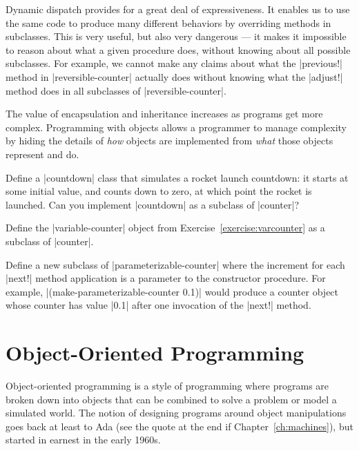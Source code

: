 \begin{schemeregion}
Dynamic dispatch provides for a great deal of expressiveness.  It enables us to use the same code to produce many different behaviors by overriding methods in subclasses.  This is very useful, but also very dangerous --- it makes it impossible to reason about what a given procedure does, without knowing about all possible subclasses.  For example, we cannot make any claims about what the \scheme|previous!| method in \scheme|reversible-counter| actually does without knowing what the \scheme|adjust!| method does in all subclasses of \scheme|reversible-counter|.  

The value of encapsulation and inheritance increases as programs get more complex.  Programming with objects allows a programmer to manage complexity by hiding the details of \emph{how} objects are implemented from \emph{what} those objects represent and do.

\beforeex
\begin{exercise}
Define a \scheme|countdown| class that simulates a rocket launch countdown: it starts at some initial value, and counts down to zero, at which point the rocket is launched.  Can you implement \scheme|countdown| as a subclass of \scheme|counter|?
\solution{\LATER{}}
\end{exercise}
\afterex

\beforeex
\begin{exercise}
Define the \scheme|variable-counter| object from Exercise~\ref{exercise:varcounter} as a subclass of \scheme|counter|.
\solution{\LATER{}}
\end{exercise}
\afterex

\beforeex
\begin{exercise}
Define a new subclass of \scheme|parameterizable-counter| where the increment for each \scheme|next!| method application is a parameter to the constructor procedure.  For example, \scheme|(make-parameterizable-counter 0.1)| would produce a counter object whose counter has value \schemeresult|0.1| after one invocation of the \scheme|next!| method.
\solution{\LATER{}}
\end{exercise}
\afterex

\section{Object-Oriented Programming}\label{sec:oohistory}

Object-oriented programming is a style of programming where programs are broken down into objects that can be combined to solve a problem or model a simulated world.  The notion of designing programs around object manipulations goes back at least to Ada (see the quote at the end if Chapter~\ref{ch:machines}), but started in earnest in the early 1960s.  


\end{schemeregion}
